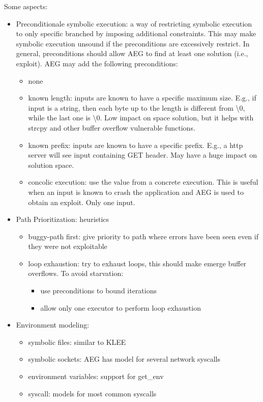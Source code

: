 Some aspects:
\begin{itemize}
  \item Preconditionale symbolic execution: a way of restricting symbolic execution to only specific branched by imposing additional constraints. This may make symbolic execution unsound if the preconditions are excessively restrict. In general, preconditions should allow AEG to find at least one solution (i.e., exploit). AEG may add the following preconditions:
  \begin{itemize}
    \item none
    \item known length: inputs are known to have a specific maximum size. E.g., if input is a string, then each byte up to the length is different from \textbackslash0, while the last one is \textbackslash0. Low impact on space solution, but it helps with strcpy and other buffer overflow vulnerable functions.
    \item known prefix: inputs are known to have a specific prefix. E.g., a http server will see input containing GET header. May have a huge impact on solution space.
    \item concolic execution: use the value from a concrete execution. This is useful when an input is known to crash the application and AEG is used to obtain an exploit. Only one input.
  \end{itemize}
  \item Path Prioritization: heuristics
    \begin{itemize}
      \item buggy-path first: give priority to path where errors have been seen even if they were not exploitable
      \item loop exhaustion: try to exhaust loops, this should make emerge buffer overflows. To avoid starvation:
        \begin{itemize}
          \item use preconditions to bound iterations
          \item allow only one executor to perform loop exhaustion
        \end{itemize}
    \end{itemize}
  \item Environment modeling:
  \begin{itemize}
    \item symbolic files: similar to KLEE
    \item symbolic sockets: AEG has model for several network syscalls
    \item environment variables: support for get\_env
    \item syscall: models for most common syscalls
  \end{itemize}
\end{itemize}


